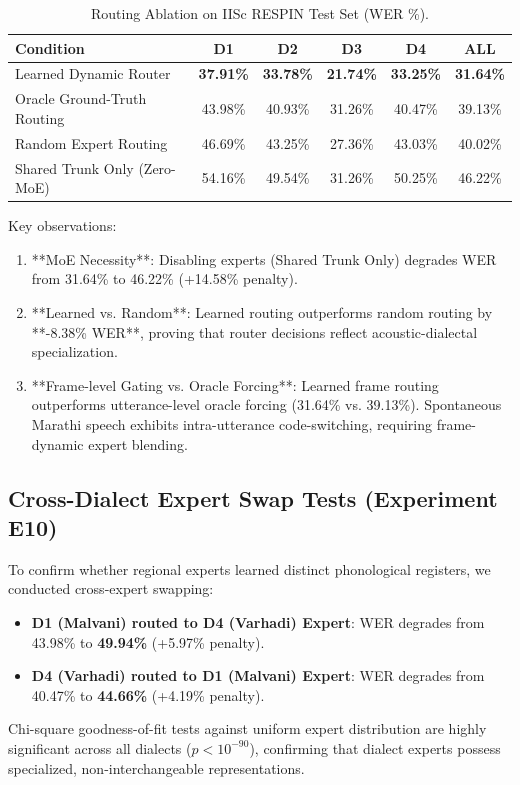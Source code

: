 \documentclass{article}
\begin{document}
\begin{table}[h]
\centering
\caption{Routing Ablation on IISc RESPIN Test Set (WER \%).}
\label{tab:routing_ablation}
\begin{tabular}{lccccc}
\toprule
\textbf{Condition} & \textbf{D1} & \textbf{D2} & \textbf{D3} & \textbf{D4} & \textbf{ALL} \\
\midrule
Learned Dynamic Router & \textbf{37.91\%} & \textbf{33.78\%} & \textbf{21.74\%} & \textbf{33.25\%} & \textbf{31.64\%} \\
Oracle Ground-Truth Routing & 43.98\% & 40.93\% & 31.26\% & 40.47\% & 39.13\% \\
Random Expert Routing & 46.69\% & 43.25\% & 27.36\% & 43.03\% & 40.02\% \\
Shared Trunk Only (Zero-MoE) & 54.16\% & 49.54\% & 31.26\% & 50.25\% & 46.22\% \\
\bottomrule
\end{tabular}
\end{table}

Key observations:
\begin{enumerate}
    \item **MoE Necessity**: Disabling experts (Shared Trunk Only) degrades WER from 31.64\% to 46.22\% (+14.58\% penalty).
    \item **Learned vs. Random**: Learned routing outperforms random routing by **-8.38\% WER**, proving that router decisions reflect acoustic-dialectal specialization.
    \item **Frame-level Gating vs. Oracle Forcing**: Learned frame routing outperforms utterance-level oracle forcing (31.64\% vs. 39.13\%). Spontaneous Marathi speech exhibits intra-utterance code-switching, requiring frame-dynamic expert blending.
\end{enumerate}

\subsection{Cross-Dialect Expert Swap Tests (Experiment E10)}
To confirm whether regional experts learned distinct phonological registers, we conducted cross-expert swapping:
\begin{itemize}
    \item \textbf{D1 (Malvani) routed to D4 (Varhadi) Expert}: WER degrades from 43.98\% to \textbf{49.94\%} (+5.97\% penalty).
    \item \textbf{D4 (Varhadi) routed to D1 (Malvani) Expert}: WER degrades from 40.47\% to \textbf{44.66\%} (+4.19\% penalty).
\end{itemize}
Chi-square goodness-of-fit tests against uniform expert distribution are highly significant across all dialects ($p < 10^{-90}$), confirming that dialect experts possess specialized, non-interchangeable representations.
\end{document}
